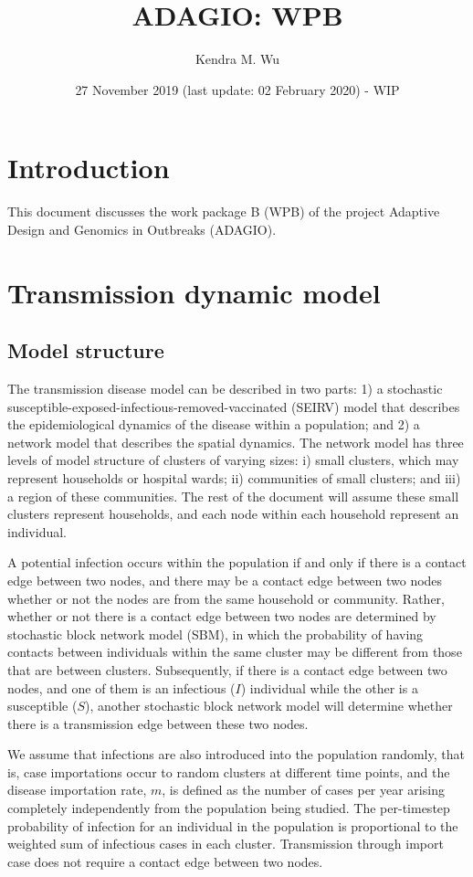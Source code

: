\documentclass[a4paper]{article}
\title{ADAGIO: WPB}
\author{Kendra M. Wu}
\date{27 November 2019 (last update: 02 February 2020) - WIP}
\begin{document}
	\maketitle
	
	\section{Introduction}
	This document discusses the work package B (WPB) of the project Adaptive Design and Genomics in Outbreaks (ADAGIO).
	
	\section{Transmission dynamic model}
	\label{sec:TransModel}
	\subsection{Model structure}
	The transmission disease model can be described in two parts: 1) a stochastic susceptible-exposed-infectious-removed-vaccinated (SEIRV) model that describes the epidemiological dynamics of the disease within a population; and 2) a network model that describes the spatial dynamics. The network model has three levels of model structure of clusters of varying sizes: i) small clusters, which may represent households or hospital wards; ii) communities of small clusters; and iii) a region of these communities. The rest of the document will assume these small clusters represent households, and each node within each household represent an individual. 
	
	A potential infection occurs within the population if and only if there is a contact edge between two nodes, and there may be a contact edge between two nodes whether or not the nodes are from the same household or community. Rather, whether or not there is a contact edge between two nodes are determined by stochastic block network model (SBM), in which the probability of having contacts between individuals within the same cluster may be different from those that are between clusters. Subsequently, if there is a contact edge between two nodes, and one of them is an infectious ($I$) individual while the other is a susceptible ($S$), another stochastic block network model will determine whether there is a transmission edge between these two nodes. 
	
	We assume that infections are also introduced into the population randomly, that is, case importations occur to random clusters at different time points, and the disease importation rate, $m$, is defined as the number of cases per year arising completely independently from the population being studied. The per-timestep probability of infection for an individual in the population is proportional to the weighted sum of infectious cases in each cluster. Transmission through import case does not require a contact edge between two nodes.
	
\end{document}
